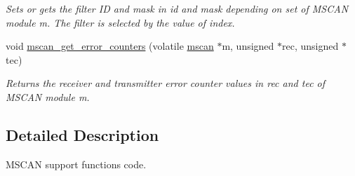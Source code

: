 \begin{DoxyCompactItemize}
\begin{DoxyCompactList}\small\item\em Sets or gets the filter ID and mask in {\itshape id} and {\itshape mask} depending on {\itshape set} of M\+S\+C\+AN module {\itshape m}. The filter is selected by the value of {\itshape index}. \end{DoxyCompactList}\item 
void \mbox{\hyperlink{group__RTEMSBSPsPowerPCGen5200MSCAN_ga0f5f444e543a0629b59ee4e286ee30d8}{mscan\+\_\+get\+\_\+error\+\_\+counters}} (volatile \mbox{\hyperlink{group__RTEMSBSPsPowerPCGen5200MSCAN_gacfd56a4a482c5e7da2cff003284b2d51}{mscan}} $\ast$m, unsigned $\ast$rec, unsigned $\ast$tec)
\begin{DoxyCompactList}\small\item\em Returns the receiver and transmitter error counter values in {\itshape rec} and {\itshape tec} of M\+S\+C\+AN module {\itshape m}. \end{DoxyCompactList}\end{DoxyCompactItemize}


\subsection{Detailed Description}
M\+S\+C\+AN support functions code. 

